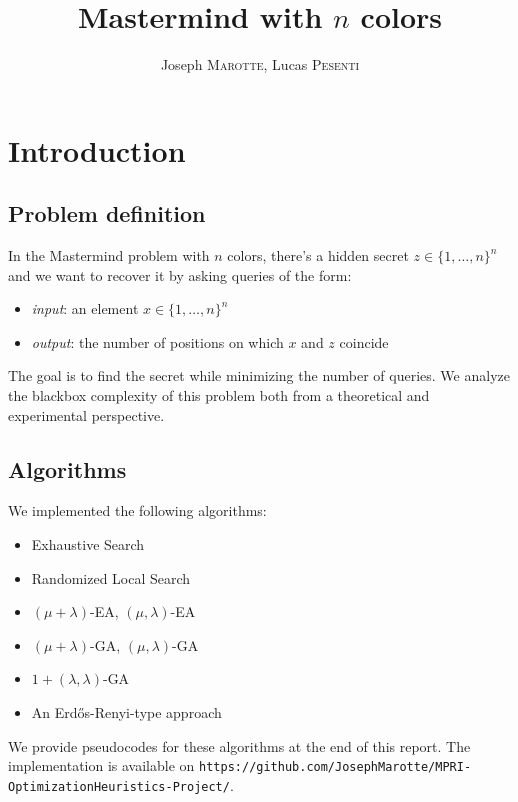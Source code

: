 \documentclass[12pt]{article}
\title{Mastermind with $n$ colors}
\author{Joseph \textsc{Marotte}, Lucas \textsc{Pesenti}}
\date{}
\theoremstyle{definition}
\theoremstyle{plain}
\theoremstyle{remark}
\begin{document}
\maketitle

\section{Introduction}

\subsection{Problem definition}

In the Mastermind problem with $n$ colors, there's a hidden secret $z\in \{1, \ldots, n\}^n$
and we want to recover it by asking queries of the form:

\begin{itemize}
	\item \textit{input}: an element $x\in\{1,\dots,n\}^n$
	\item \textit{output}: the number of positions on which $x$ and $z$ coincide
\end{itemize}

The goal is to find the secret while minimizing the number of queries. We analyze the
blackbox complexity of this problem both from a theoretical and experimental perspective.

\subsection{Algorithms}

We implemented the following algorithms:

\begin{itemize}
    \item Exhaustive Search
    \item Randomized Local Search
    \item $(\mu+\lambda)$-EA, $(\mu,\lambda)$-EA
    \item $(\mu+\lambda)$-GA, $(\mu,\lambda)$-GA
    \item $1+(\lambda,\lambda)$-GA
    \item An Erd\H{o}s-Renyi-type approach
\end{itemize}

We provide pseudocodes for these algorithms at the end of this report. The implementation
is available on \texttt{https://github.com/JosephMarotte/MPRI-OptimizationHeuristics-Project/}.
\end{document}
